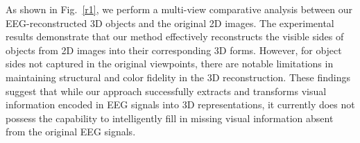 \documentclass[conference]{IEEEtran}
\begin{document}
As shown in Fig.~\ref{r1}, we perform a multi-view comparative analysis between our EEG-reconstructed 3D objects and the original 2D images. The experimental results demonstrate that our method effectively reconstructs the visible sides of objects from 2D images into their corresponding 3D forms. However, for object sides not captured in the original viewpoints, there are notable limitations in maintaining structural and color fidelity in the 3D reconstruction. These findings suggest that while our approach successfully extracts and transforms visual information encoded in EEG signals into 3D representations, it currently does not possess the capability to intelligently fill in missing visual information absent from the original EEG signals.

\end{document}
